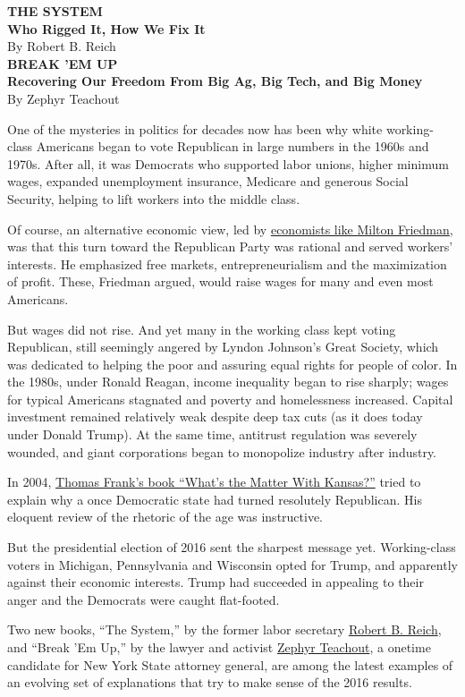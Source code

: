 \textbf{THE SYSTEM}\\
\textbf{Who Rigged It, How We Fix It}\\
By Robert B. Reich\\
\textbf{BREAK 'EM UP}\\
\textbf{Recovering Our Freedom From Big Ag, Big Tech, and Big Money}\\
By Zephyr Teachout

One of the mysteries in politics for decades now has been why white
working-class Americans began to vote Republican in large numbers in the
1960s and 1970s. After all, it was Democrats who supported labor unions,
higher minimum wages, expanded unemployment insurance, Medicare and
generous Social Security, helping to lift workers into the middle class.

Of course, an alternative economic view, led by
\href{https://www.econlib.org/library/Enc/bios/Friedman.html}{economists
like Milton Friedman}, was that this turn toward the Republican Party
was rational and served workers' interests. He emphasized free markets,
entrepreneurialism and the maximization of profit. These, Friedman
argued, would raise wages for many and even most Americans.

But wages did not rise. And yet many in the working class kept voting
Republican, still seemingly angered by Lyndon Johnson's Great Society,
which was dedicated to helping the poor and assuring equal rights for
people of color. In the 1980s, under Ronald Reagan, income inequality
began to rise sharply; wages for typical Americans stagnated and poverty
and homelessness increased. Capital investment remained relatively weak
despite deep tax cuts (as it does today under Donald Trump). At the same
time, antitrust regulation was severely wounded, and giant corporations
began to monopolize industry after industry.

In 2004,
\href{https://www.nytimes3xbfgragh.onion/2004/06/13/books/heartland-security.html}{Thomas
Frank's book ``What's the Matter With Kansas?''} tried to explain why a
once Democratic state had turned resolutely Republican. His eloquent
review of the rhetoric of the age was instructive.

But the presidential election of 2016 sent the sharpest message yet.
Working-class voters in Michigan, Pennsylvania and Wisconsin opted for
Trump, and apparently against their economic interests. Trump had
succeeded in appealing to their anger and the Democrats were caught
flat-footed.

Two new books, ``The System,'' by the former labor secretary
\href{https://robertreich.org}{Robert B. Reich}, and ``Break 'Em Up,''
by the lawyer and activist
\href{https://www.chicagotribune.com/opinion/ct-nyt-zephyr-teachout-joe-biden-corrupt-op-ed-20200125-ny7pqixehrc7jbjdgts7pzny2u-story.html}{Zephyr
Teachout}, a onetime candidate for New York State attorney general, are
among the latest examples of an evolving set of explanations that try to
make sense of the 2016 results.

